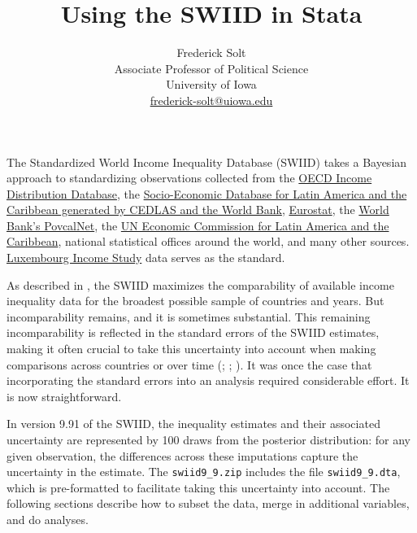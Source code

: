 \documentclass[11pt]{article}
\begin{document}
\title{Using the SWIID in Stata}
\author{
Frederick Solt\\
  Associate Professor of Political Science\\
  University of Iowa\\
  \href{mailto:frederick-solt@uiowa.edu}{frederick-solt@uiowa.edu}}
\date{}
\maketitle 

The Standardized World Income Inequality Database (SWIID) takes a Bayesian approach to standardizing observations collected from the \href{http://www.oecd.org/social/inequality.htm}{OECD Income Distribution Database}, the \href{http://sedlac.econo.unlp.edu.ar/eng/}{Socio-Economic Database for Latin America and the Caribbean generated by CEDLAS and the World Bank}, \href{http://epp.eurostat.ec.europa.eu}{Eurostat}, the \href{http://iresearch.worldbank.org/PovcalNet/index.htm}{World Bank's PovcalNet}, the \href{http://interwp.cepal.org/sisgen/ConsultaIntegrada.asp?idIndicador=250\&idioma=e}{UN Economic Commission for Latin America and the Caribbean}, national statistical offices around the world, and many other sources.  \href{http://www.lisdatacenter.org}{Luxembourg Income Study} data serves as the standard.  

As described in \citet{Solt2020}, the SWIID maximizes the comparability of available income inequality data for the broadest possible sample of countries and years.  But incomparability remains, and it is sometimes substantial.  This remaining incomparability is reflected in the standard errors of the SWIID estimates, making it often crucial to take this uncertainty into account when making comparisons across countries or over time (\citealt[238]{Solt2009}; \citealt[14]{Solt2016_nv}; \citealt{Solt2020}).  It was once the case that incorporating the standard errors into an analysis required considerable effort.  It is now straightforward.

In version 9.91 of the SWIID, the inequality estimates and their associated uncertainty are represented by 100 draws from the posterior
distribution: for any given observation, the differences across these imputations capture the uncertainty in the estimate.  The \verb+swiid9_9.zip+ includes the file \verb+swiid9_9.dta+, which is pre-formatted to facilitate taking this uncertainty into account.  The following sections describe how to subset the data, merge in additional variables, and do analyses.
\end{document}

